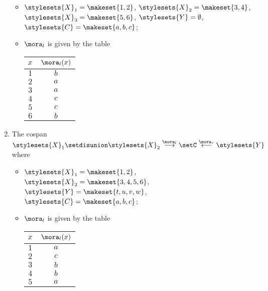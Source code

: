 \begin{gradedexercise}
\begin{enumerate}
\begin{itemize}
                  \item $\stylesets{X}_1 = \makeset{1, 2}$, $\stylesets{X}_2 = \makeset{3, 4}$, $\stylesets{X}_3 = \makeset{5, 6}$, $\stylesets{Y} = \emptyset$, $\stylesets{C} = \makeset{a, b, c}$;
                  \item $\mora_l$ is given by the table
                        \begin{center}
                            \begin{tabular}{c|c}
                                $x$ & $\mora_l(x)$ \\
                                \hline
                                $1$ & $b$ \\
                                $2$ & $a$ \\
                                $3$ & $a$ \\
                                $4$ & $c$ \\
                                $5$ & $c$ \\
                                $6$ & $b$
                            \end{tabular}
                        \end{center}
              \end{itemize}
        \item The cospan $\stylesets{X}_1 \setdisunion \stylesets{X}_2 \overset{\mora_l}{\longrightarrow} \setC \overset{\mora_r}{\longleftarrow} \stylesets{Y}$ where
              \begin{itemize}
                  \item $\stylesets{X}_1 = \makeset{1, 2}$, $\stylesets{X}_2 = \makeset{3, 4, 5, 6}$, $\stylesets{Y} = \makeset{t, u, v, w}$, $\stylesets{C} = \makeset{a, b, c}$;
                  \item $\mora_l$ is given by the table
                        \begin{center}
                            \begin{tabular}{c|c}
                                $x$ & $\mora_l(x)$ \\
                                \hline
                                $1$ & $a$ \\
                                $2$ & $c$ \\
                                $3$ & $b$ \\
                                $4$ & $b$ \\
                                $5$ & $a$ \\

\end{tabular}
\end{center}
\end{itemize}
\end{enumerate}
\end{gradedexercise}

